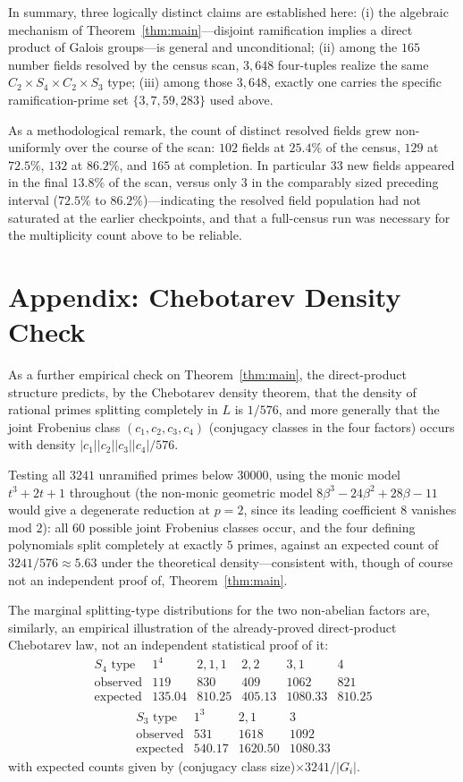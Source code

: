 \documentclass[12pt]{amsart}
\begin{document}
In summary, three logically distinct claims are established here:
(i) the algebraic mechanism of Theorem~\ref{thm:main}---disjoint
ramification implies a direct product of Galois groups---is general
and unconditional; (ii) among the $165$ number fields resolved by the
census scan, $3{,}648$ four-tuples realize the same
$C_2\times S_4\times C_2\times S_3$ type; (iii) among those $3{,}648$,
exactly one carries the specific ramification-prime set
$\{3,7,59,283\}$ used above.

As a methodological remark, the count of distinct resolved fields grew
non-uniformly over the course of the scan: $102$ fields at $25.4\%$ of
the census, $129$ at $72.5\%$, $132$ at $86.2\%$, and $165$ at
completion. In particular $33$ new fields appeared in the final
$13.8\%$ of the scan, versus only $3$ in the comparably sized preceding
interval ($72.5\%$ to $86.2\%$)---indicating the resolved field
population had not saturated at the earlier checkpoints, and that a
full-census run was necessary for the multiplicity count above to be
reliable.

\section*{Appendix: Chebotarev Density Check}

As a further empirical check on Theorem~\ref{thm:main}, the direct-product
structure predicts, by the Chebotarev density theorem, that the density
of rational primes splitting completely in $L$ is $1/576$, and more
generally that the joint Frobenius class $(c_1,c_2,c_3,c_4)$ (conjugacy
classes in the four factors) occurs with density
$|c_1||c_2||c_3||c_4|/576$.

Testing all $3241$ unramified primes below $30000$, using the monic
model $t^3+2t+1$ throughout (the non-monic geometric model
$8\beta^3-24\beta^2+28\beta-11$ would give a degenerate reduction at
$p=2$, since its leading coefficient $8$ vanishes mod $2$): all $60$
possible joint Frobenius classes occur, and the four defining
polynomials split completely at exactly $5$ primes,
against an expected count of $3241/576\approx5.63$ under the theoretical
density---consistent with, though of course not an independent proof
of, Theorem~\ref{thm:main}.

The marginal splitting-type distributions for the two non-abelian
factors are, similarly, an empirical illustration of the already-proved
direct-product Chebotarev law, not an independent statistical proof of
it:
\[
\begin{array}{c|ccccc}
S_4\text{ type} & 1^4 & 2,1,1 & 2,2 & 3,1 & 4\\\hline
\text{observed} & 119 & 830 & 409 & 1062 & 821\\
\text{expected} & 135.04 & 810.25 & 405.13 & 1080.33 & 810.25
\end{array}
\]
\[
\begin{array}{c|ccc}
S_3\text{ type} & 1^3 & 2,1 & 3\\\hline
\text{observed} & 531 & 1618 & 1092\\
\text{expected} & 540.17 & 1620.50 & 1080.33
\end{array}
\]
with expected counts given by (conjugacy class size)$\times3241/|G_i|$.
\end{document}
